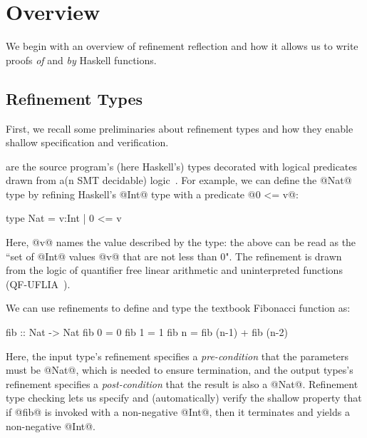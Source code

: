 \section{Overview}
\label{sec:refinementreflection:overview}
\label{sec:examples}

We begin with an overview of refinement reflection and
how it allows us to write proofs \emph{of} and \emph{by}
Haskell functions.

\subsection{Refinement Types}

First, we recall some preliminaries about refinement types
and how they enable shallow specification and verification.

 are the source program's (here
Haskell's) types decorated with logical predicates drawn
from a(n SMT decidable) logic~\citep{ConstableS87,Rushby98}.
%
For example, we can define the @Nat@ type by refining
Haskell's @Int@ type with a predicate @0 <= v@:
%
\begin{code}
  type Nat = { v:Int | 0 <= v }
\end{code}
%
Here, @v@ names the value described by the type:
the above can be read as the
``set of @Int@ values @v@ that are not less than 0".
The refinement is drawn from the logic of quantifier
free linear arithmetic and uninterpreted functions
(QF-UFLIA~\cite{SMTLIB2}).

%
We can use refinements to define and type the
textbook Fibonacci function as:
%
\begin{code}
  fib :: Nat -> Nat
  fib 0 = 0
  fib 1 = 1
  fib n = fib (n-1) + fib (n-2)
\end{code}
%
Here, the input type's refinement specifies a
\emph{pre-condition} that the parameters must
be @Nat@, which is needed to ensure termination,
and the output types's refinement specifies a
\emph{post-condition} that the result is also a @Nat@.
%
Refinement type checking lets us specify
and (automatically) verify the shallow property
that if @fib@ is invoked with a non-negative
@Int@, then it terminates and yields
a non-negative @Int@.

